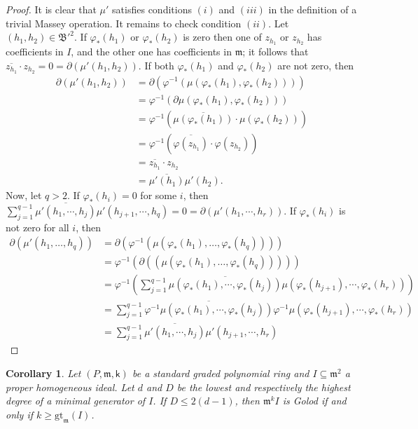 \documentclass[10pt,reqno]{amsart}
\newtheorem{corollary}[subsection]{Corollary}
\theoremstyle{definition}
\theoremstyle{remark}
\numberwithin{equation}{section}
\newcommand{\kk}{\mathsf k}
\newcommand{\m}{\mathfrak m}
\numberwithin{equation}{section}
\begin{document}
\begin{proof}
    It is clear that $\mu'$ satisfies conditions $(i)$ and $(iii)$ in the definition of a trivial Massey operation. It remains to check condition $(ii)$. Let $(h_1,h_2)\in \mathfrak B'^2$. If $\varphi_*(h_1) $ or $\varphi_*(h_2)$ is zero then one of $z_{h_1}$ or $z_{h_2}$ has coefficients in $I$, and the other one has coefficients in $\m$; it follows that $\overline{z_{h_1}}\cdot z_{h_2}=0=\partial (\mu'(h_1, h_2))$. If both $\varphi_*(h_1) $ and $\varphi_*(h_2)$ are not zero, then \begin{equation*}
    \begin{aligned}
    \partial(\mu'(h_1,h_2))&=\partial(\varphi^{-1}(\mu(\varphi_*(h_1),\varphi_*(h_2))))\\
    &=\varphi^{-1}(\partial\mu(\varphi_*(h_1),\varphi_*(h_2)))\\
    &=\varphi^{-1}(\overline{\mu(\varphi_*(h_1))}\cdot \mu(\varphi_*(h_2)))\\
    &=\varphi^{-1}(\overline{\varphi(z_{h_1})}\cdot\varphi(z_{h_2}))\\
    &=\overline{z_{h_1}}\cdot z_{h_2}\\
    &=\overline{\mu'(h_1)}\mu'(h_2).  
    \end{aligned}
    \end{equation*}
    Now, let $q>2$. If $ \varphi_*(h_i)=0$ for some $i$, then  $ \sum_{j=1}^{q-1}\overline{\mu'(h_1,\cdots,h_{j})}\mu'(h_{j+1},\cdots,h_q)=0=\partial(\mu'(h_1, \cdots, h_r))$. If $ \varphi_*(h_i)$ is not zero for all $i$, then\begin{equation*}
    \begin{aligned}
    \partial(\mu'(h_1,\ldots,h_q))&=\partial(\varphi^{-1}(\mu(\varphi_*(h_1),\ldots,\varphi_*(h_q))))\\
    &=\varphi^{-1}(\partial((\mu(\varphi_*(h_1),\ldots,\varphi_*(h_q)))))\\
    &=\varphi^{-1}(  \sum_{j=1}^{q-1}\overline{\mu(\varphi_*(h_1),\cdots,\varphi_*(h_{j}))}\mu(\varphi_*(h_{j+1}),\cdots,\varphi_*(h_r)))\\
    &=  \sum_{j=1}^{q-1}\overline{\varphi^{-1}\mu(\varphi_*(h_1),\cdots,\varphi_*(h_{j}))}\varphi^{-1}\mu(\varphi_*(h_{j+1}),\cdots,\varphi_*(h_r))\\
    &=  \sum_{j=1}^{q-1}\overline{\mu'(h_1,\cdots,h_{j})}\mu'(h_{j+1},\cdots,h_r)
    \end{aligned}
    \end{equation*}
\end{proof}

\begin{corollary}
    Let $(P,\m,\kk)$ be a standard graded polynomial ring and $I\subseteq \m^2$ a proper homogeneous ideal. Let $d$ and $D$ be the lowest and respectively the highest degree of a minimal generator of $I$. If $D\leq 2(d-1)$, then $ \m^{k}I$ is Golod if and only if $k\geq\mathrm{gt}_{\m}(I)_{}$. 
\end{corollary}
\end{document}
